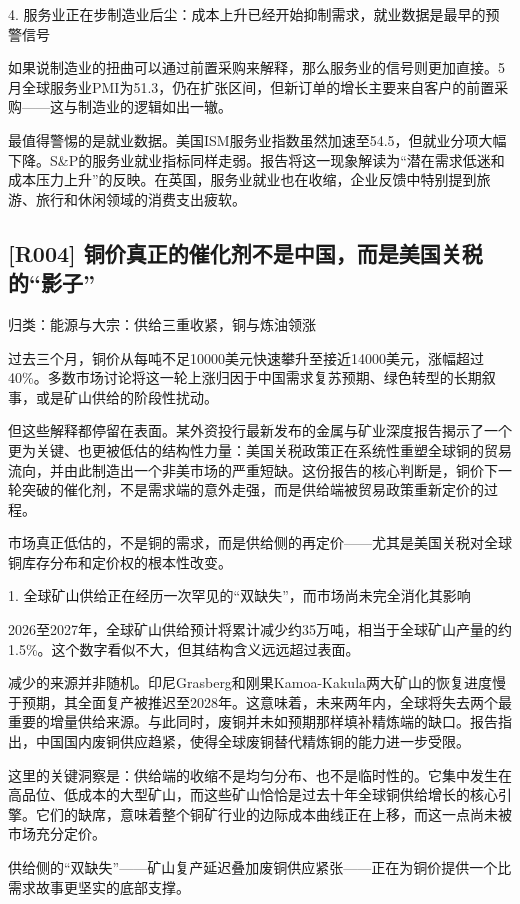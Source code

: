 \documentclass[11pt]{ctexart}
\begin{document}
4. 服务业正在步制造业后尘：成本上升已经开始抑制需求，就业数据是最早的预警信号

如果说制造业的扭曲可以通过前置采购来解释，那么服务业的信号则更加直接。5月全球服务业PMI为51.3，仍在扩张区间，但新订单的增长主要来自客户的前置采购——这与制造业的逻辑如出一辙。

最值得警惕的是就业数据。美国ISM服务业指数虽然加速至54.5，但就业分项大幅下降。S\&P的服务业就业指标同样走弱。报告将这一现象解读为“潜在需求低迷和成本压力上升”的反映。在英国，服务业就业也在收缩，企业反馈中特别提到旅游、旅行和休闲领域的消费支出疲软。

\subsection{[R004] 铜价真正的催化剂不是中国，而是美国关税的“影子”}
{\small\color{refgray}归类：能源与大宗：供给三重收紧，铜与炼油领涨}

过去三个月，铜价从每吨不足10000美元快速攀升至接近14000美元，涨幅超过40\%。多数市场讨论将这一轮上涨归因于中国需求复苏预期、绿色转型的长期叙事，或是矿山供给的阶段性扰动。

但这些解释都停留在表面。某外资投行最新发布的金属与矿业深度报告揭示了一个更为关键、也更被低估的结构性力量：美国关税政策正在系统性重塑全球铜的贸易流向，并由此制造出一个非美市场的严重短缺。这份报告的核心判断是，铜价下一轮突破的催化剂，不是需求端的意外走强，而是供给端被贸易政策重新定价的过程。

市场真正低估的，不是铜的需求，而是供给侧的再定价——尤其是美国关税对全球铜库存分布和定价权的根本性改变。

1. 全球矿山供给正在经历一次罕见的“双缺失”，而市场尚未完全消化其影响

2026至2027年，全球矿山供给预计将累计减少约35万吨，相当于全球矿山产量的约1.5\%。这个数字看似不大，但其结构含义远远超过表面。

减少的来源并非随机。印尼Grasberg和刚果Kamoa-Kakula两大矿山的恢复进度慢于预期，其全面复产被推迟至2028年。这意味着，未来两年内，全球将失去两个最重要的增量供给来源。与此同时，废铜并未如预期那样填补精炼端的缺口。报告指出，中国国内废铜供应趋紧，使得全球废铜替代精炼铜的能力进一步受限。

这里的关键洞察是：供给端的收缩不是均匀分布、也不是临时性的。它集中发生在高品位、低成本的大型矿山，而这些矿山恰恰是过去十年全球铜供给增长的核心引擎。它们的缺席，意味着整个铜矿行业的边际成本曲线正在上移，而这一点尚未被市场充分定价。

供给侧的“双缺失”——矿山复产延迟叠加废铜供应紧张——正在为铜价提供一个比需求故事更坚实的底部支撑。
\end{document}
